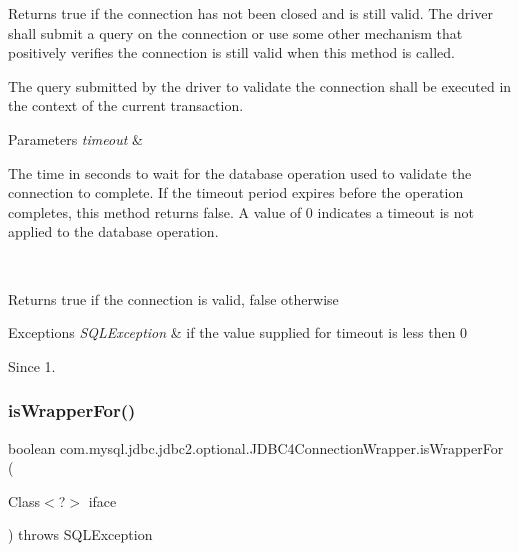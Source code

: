 Returns true if the connection has not been closed and is still valid. The driver shall submit a query on the connection or use some other mechanism that positively verifies the connection is still valid when this method is called. 

The query submitted by the driver to validate the connection shall be executed in the context of the current transaction.


\begin{DoxyParams}{Parameters}
{\em timeout} & 
\begin{DoxyItemize}
\item The time in seconds to wait for the database operation used to validate the connection to complete. If the timeout period expires before the operation completes, this method returns false. A value of 0 indicates a timeout is not applied to the database operation. 
\end{DoxyItemize}\\
\hline
\end{DoxyParams}
\begin{DoxyReturn}{Returns}
true if the connection is valid, false otherwise 
\end{DoxyReturn}

\begin{DoxyExceptions}{Exceptions}
{\em S\+Q\+L\+Exception} & if the value supplied for {\ttfamily timeout} is less then 0 \\
\hline
\end{DoxyExceptions}
\begin{DoxySince}{Since}
1. 
\end{DoxySince}
\mbox{\label{classcom_1_1mysql_1_1jdbc_1_1jdbc2_1_1optional_1_1_j_d_b_c4_connection_wrapper_a0192ce28620a4eb27512c5a15534c8bc}} 
\subsubsection{\texorpdfstring{is\+Wrapper\+For()}{isWrapperFor()}}
{\footnotesize\ttfamily boolean com.\+mysql.\+jdbc.\+jdbc2.\+optional.\+J\+D\+B\+C4\+Connection\+Wrapper.\+is\+Wrapper\+For (\begin{DoxyParamCaption}\item[{Class$<$?$>$}]{iface }\end{DoxyParamCaption}) throws S\+Q\+L\+Exception}

